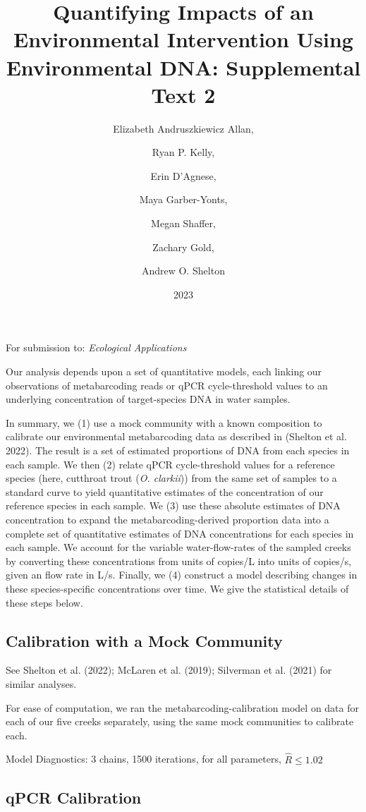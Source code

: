 \documentclass[
]{article}
\title{Quantifying Impacts of an Environmental Intervention Using
Environmental DNA: Supplemental Text 2}
\author{Elizabeth Andruszkiewicz Allan, \and Ryan P. Kelly, \and Erin
D'Agnese, \and Maya Garber-Yonts, \and Megan Shaffer, \and Zachary
Gold, \and Andrew O. Shelton}
\date{2023}
\begin{document}
\maketitle

For submission to: \textit{Ecological Applications}

Our analysis depends upon a set of quantitative models, each linking our
observations of metabarcoding reads or qPCR cycle-threshold values to an
underlying concentration of target-species DNA in water samples.

In summary, we (1) use a mock community with a known composition to
calibrate our environmental metabarcoding data as described in (Shelton
et al. 2022). The result is a set of estimated proportions of DNA from
each species in each sample. We then (2) relate qPCR cycle-threshold
values for a reference species (here, cutthroat trout (\emph{O.
clarkii})) from the same set of samples to a standard curve to yield
quantitative estimates of the concentration of our reference species in
each sample. We (3) use these absolute estimates of DNA concentration to
expand the metabarcoding-derived proportion data into a complete set of
quantitative estimates of DNA concentrations for each species in each
sample. We account for the variable water-flow-rates of the sampled
creeks by converting these concentrations from units of copies/L into
units of copies/s, given an flow rate in L/s. Finally, we (4) construct
a model describing changes in these species-specific concentrations over
time. We give the statistical details of these steps below.

\hypertarget{calibration-with-a-mock-community}{%
\subsection{Calibration with a Mock
Community}\label{calibration-with-a-mock-community}}

See Shelton et al. (2022); McLaren et al. (2019); Silverman et al.
(2021) for similar analyses.

For ease of computation, we ran the metabarcoding-calibration model on
data for each of our five creeks separately, using the same mock
communities to calibrate each.

Model Diagnostics: 3 chains, 1500 iterations, for all parameters,
\(\hat{R} \leq 1.02\)

\hypertarget{qpcr-calibration}{%
\subsection{qPCR Calibration}\label{qpcr-calibration}}
\end{document}
